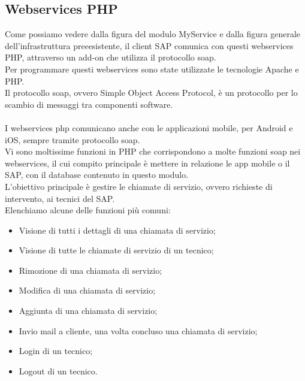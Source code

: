 \subsection{Webservices PHP}
Come possiamo vedere dalla figura del modulo MyService e dalla figura generale dell'infrastruttura preeesistente, il client SAP comunica con questi webservices PHP, attraverso un add-on che utilizza il protocollo \gls{soap}.\\
Per programmare questi webservices sono state utilizzate le tecnologie Apache e PHP.\\ 
Il protocollo \gls{soap}, ovvero Simple Object Access Protocol, è un protocollo per lo scambio di messaggi tra componenti software.\\\\
I webservices php comunicano anche con le applicazioni mobile, per Android e iOS, sempre tramite protocollo \gls{soap}.\\
Vi sono moltissime funzioni in PHP che corrispondono a molte funzioni \gls{soap} nei webservices, il cui compito principale è mettere in relazione le app mobile o il SAP, con il database contenuto in questo modulo.\\
L'obiettivo principale è gestire le chiamate di servizio, ovvero richieste di intervento, ai tecnici del SAP.\\
Elenchiamo alcune delle funzioni più comuni:
\begin{itemize}
	\item Visione di tutti i dettagli di una chiamata di servizio;
	\item Visione di tutte le chiamate di servizio di un tecnico;
	\item Rimozione di una chiamata di servizio;
	\item Modifica di una chiamata di servizio;
	\item Aggiunta di una chiamata di servizio;
	\item Invio mail a cliente, una volta concluso una chiamata di servizio;
	\item Login di un tecnico;
	\item Logout di un tecnico.
\end{itemize}
\newpage
